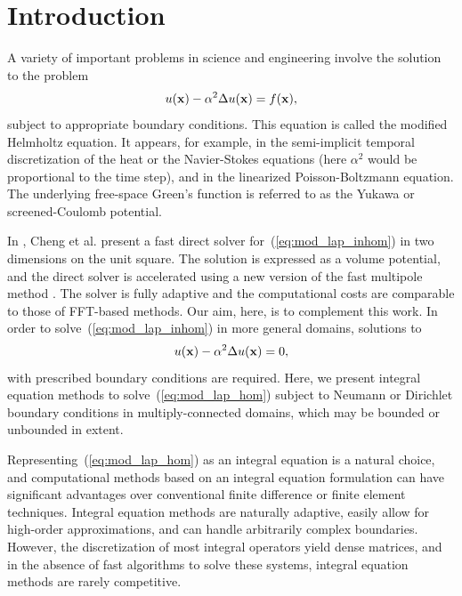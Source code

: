 \documentclass[preprint,12pt]{elsarticle}
\newcommand{\x}{{\bf x}}
\newcommand{\eqr}[1]{~(\ref{#1})}
\begin{document}
\section{Introduction}
A variety of important problems in science and engineering involve the solution to
the problem
\begin{equation}
  u(\x) - \alpha^2 \Delta u(\x) = f(\x),
  \label{eq:mod_lap_inhom}
\end{equation}
subject to appropriate boundary conditions. 
This equation is called the modified Helmholtz equation. 
It appears, for example, in the semi-implicit temporal discretization
of the heat or the Navier-Stokes equations \cite{int:equation:nse} (here $\alpha^2$ would be
proportional to the time step), and in the 
linearized Poisson-Boltzmann equation.  
The underlying free-space Green's function is referred to as the Yukawa or screened-Coulomb potential. 

In \cite{modified:helmholtz}, Cheng et al. present a
fast direct solver for\eqr{eq:mod_lap_inhom} in two dimensions on the unit square.  
The solution is expressed as a volume potential, and the direct solver is accelerated using a new version of the fast multipole method \cite{screened_coulomb,new_FMM}. 
The solver is fully adaptive and the computational costs are comparable to those of FFT-based methods.
Our aim, here, is to complement this work. 
In order to solve\eqr{eq:mod_lap_inhom} in more general domains, solutions to
\begin{equation}
  u(\x) - \alpha^2 \Delta u(\x) = 0,
  \label{eq:mod_lap_hom}
\end{equation}
with prescribed boundary conditions are required. 
Here, we present integral equation methods to solve\eqr{eq:mod_lap_hom} subject to Neumann or Dirichlet boundary conditions
in multiply-connected domains, which may be bounded or unbounded in
extent.  

Representing\eqr{eq:mod_lap_hom} as an integral equation is a natural choice, and computational methods based on an integral equation formulation can have significant advantages over conventional finite difference or finite element techniques.
Integral equation methods are naturally adaptive, easily allow for high-order approximations, and can handle arbitrarily complex boundaries. 
However, the discretization of most integral operators yield dense matrices, and 
in the absence of fast algorithms to solve these systems, integral equation methods are rarely competitive. 
\end{document}
